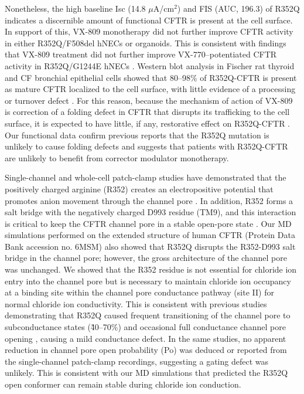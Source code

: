 Nonetheless, the high baseline Isc (14.8 $\mu$A/cm$^2$) and FIS (AUC, 196.3) of R352Q indicates a discernible amount of functional CFTR is present at the cell surface. In support of this, VX-809 monotherapy did not further improve CFTR activity in either R352Q/F508del hNECs or organoids. This is consistent with findings that VX-809 treatment did not further improve VX-770–potentiated CFTR activity in R352Q/G1244E hNECs \cite{pranke2017}. Western blot analysis in Fischer rat thyroid and CF bronchial epithelial cells showed that 80–98\% of R352Q-CFTR is present as mature CFTR localized to the cell surface, with little evidence of a processing or turnover defect \cite{vangoor2014, veit2020}. For this reason, because the mechanism of action of VX-809 is correction of a folding defect in CFTR that disrupts its trafficking to the cell surface, it is expected to have little, if any, restorative effect on R352Q-CFTR \cite{vangoor2011}. Our functional data confirm previous reports that the R352Q mutation is unlikely to cause folding defects and suggests that patients with R352Q-CFTR are unlikely to benefit from corrector modulator monotherapy.

Single-channel and whole-cell patch-clamp studies have demonstrated that the positively charged arginine (R352) creates an electropositive potential that promotes anion movement through the channel pore \cite{guinamard1999}. In addition, R352 forms a salt bridge with the negatively charged D993 residue (TM9), and this interaction is critical to keep the CFTR channel pore in a stable open-pore state \cite{cui2013a}. Our MD simulations performed on the extended structure of human CFTR (Protein Data Bank accession no. 6MSM) also showed that R352Q disrupts the R352-D993 salt bridge in the channel pore; however, the gross architecture of the channel pore was unchanged. We showed that the R352 residue is not essential for chloride ion entry into the channel pore but is necessary to maintain chloride ion occupancy at a binding site within the channel pore conductance pathway (site II) for normal chloride ion conductivity. This is consistent with previous studies demonstrating that R352Q caused frequent transitioning of the channel pore to subconductance states (\~40–70\%) and occasional full conductance channel pore opening \cite{zhang2017, cui2008}, causing a mild conductance defect. In the same studies, no apparent reduction in channel pore open probability (Po) was deduced or reported from the single-channel patch-clamp recordings, suggesting a gating defect was unlikely. This is consistent with our MD simulations that predicted the R352Q open conformer can remain stable during chloride ion conduction.

